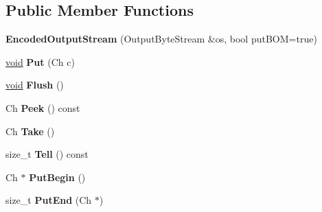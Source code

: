 \subsection*{Public Member Functions}
\begin{DoxyCompactItemize}
\item 
\hypertarget{class_encoded_output_stream_ad3360c613a30a6a15526ae9ad63bd004}{}{\bfseries Encoded\+Output\+Stream} (Output\+Byte\+Stream \&os, bool put\+B\+O\+M=true)\label{class_encoded_output_stream_ad3360c613a30a6a15526ae9ad63bd004}

\item 
\hypertarget{class_encoded_output_stream_a0f3c00f94c195a38d78c05ecda497481}{}\hyperlink{_s_d_l__audio_8h_a52835ae37c4bb905b903cbaf5d04b05f}{void} {\bfseries Put} (Ch c)\label{class_encoded_output_stream_a0f3c00f94c195a38d78c05ecda497481}

\item 
\hypertarget{class_encoded_output_stream_a657188f6a9f0fae01a4012c288d3fd46}{}\hyperlink{_s_d_l__audio_8h_a52835ae37c4bb905b903cbaf5d04b05f}{void} {\bfseries Flush} ()\label{class_encoded_output_stream_a657188f6a9f0fae01a4012c288d3fd46}

\item 
\hypertarget{class_encoded_output_stream_aa1dbe6b921fe788f3229024fb5598647}{}Ch {\bfseries Peek} () const \label{class_encoded_output_stream_aa1dbe6b921fe788f3229024fb5598647}

\item 
\hypertarget{class_encoded_output_stream_a90f5a5e1598316a417ef5b6ad3d49f36}{}Ch {\bfseries Take} ()\label{class_encoded_output_stream_a90f5a5e1598316a417ef5b6ad3d49f36}

\item 
\hypertarget{class_encoded_output_stream_ab580ac97f1a22c2a6abc4a31bb5c8272}{}size\+\_\+t {\bfseries Tell} () const \label{class_encoded_output_stream_ab580ac97f1a22c2a6abc4a31bb5c8272}

\item 
\hypertarget{class_encoded_output_stream_a78934de4f76c9fa65238e65d3630cbc5}{}Ch $\ast$ {\bfseries Put\+Begin} ()\label{class_encoded_output_stream_a78934de4f76c9fa65238e65d3630cbc5}

\item 
\hypertarget{class_encoded_output_stream_a818695f6d3fa8896e9d7d0fbdc7d4514}{}size\+\_\+t {\bfseries Put\+End} (Ch $\ast$)\label{class_encoded_output_stream_a818695f6d3fa8896e9d7d0fbdc7d4514}

\end{DoxyCompactItemize}


